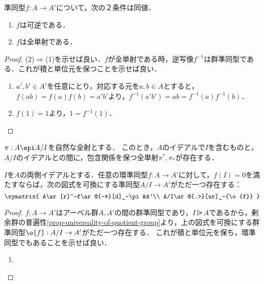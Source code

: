 \documentclass[uplatex,dvipdfmx]{jsreport}
\begin{document}
\begin{lemma}[可逆性の特徴付け]\label{lemma-characterization-of-invertibleness-of-ring-homomorphism}
    準同型$f:A\to A'$について，次の２条件は同値．
    \begin{enumerate}
        \item $f$は可逆である．
        \item $f$は全単射である．
    \end{enumerate}
\end{lemma}
\begin{proof}
    (2)$\Rightarrow$(1)を示せば良い．$f$が全単射である時，逆写像$f^{-1}$は群準同型である．これが積と単位元を保つことを示せば良い．
    \begin{enumerate}
        \item $a',b'\in A'$を任意にとり，対応する元を$a,b\in A$とすると，$f(ab)=f(a)f(b)=a'b'$より，$f^{-1}(a'b')=ab=f^{-1}(a)f^{-1}(b)$．
        \item $f(1)=1$より，$1=f^{-1}(1)$．
    \end{enumerate}
\end{proof}

\begin{proposition}[イデアルの対応]\label{prop-correspondence-of-ideals}
    $\pi:A\epi A/I$を自然な全射とする．
    このとき，$A$のイデアルで$I$を含むものと，$A/I$のイデアルとの間に，包含関係を保つ全単射$\pi^*,\pi_*$が存在する．
\end{proposition}

\begin{proposition}[剰余環の普遍性]\label{prop-universality-of-quotient-ring}
    $I$を$A$の両側イデアルとする．任意の環準同型$f:A\to A'$に対して，$f(I)=0$を満たすならば，次の図式を可換にする準同型$A/I\to A'$がただ一つ存在する：
    \[\xymatrix{
        A\ar[r]^-f\ar@{->>}[d]_-\pi&A'\\
        A/I\ar@{.>}[ur]_-{\o{f}}
    }\]
\end{proposition}
\begin{proof}
    $f:A\to A'$はアーベル群$A,A'$の間の群準同型であり，$I\rsub A$であるから，剰余群の普遍性\ref{prop-universality-of-quotient-group}より，上の図式を可換にする群準同型$\o{f}:A/I\to A'$がただ一つ存在する．
    これが積と単位元を保ち，環準同型でもあることを示せば良い．
    \begin{enumerate}
        \item 
    \end{enumerate}
\end{proof}
\end{document}
